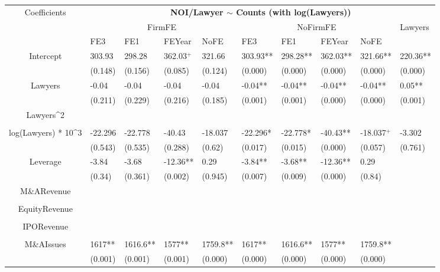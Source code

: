 \documentclass{article}
\begin{document}
\begin{table}[H]
\centering
\begin{tabular}{|clllllllll|}
\hline
\multirow{3}{*}{Coefficients} & \multicolumn{9}{c|}{\textbf{NOI/Lawyer $\sim$ Counts (with log(Lawyers))}} \\
\cline{2-10}
& \multicolumn{4}{c}{FirmFE} & \multicolumn{4}{c}{NoFirmFE} & \multirow{2}{*}{Lawyers} \\
\cline{2-9}
& FE3 & FE1 & FEYear & NoFE & FE3 & FE1 & FEYear & NoFE &  \\
\hline
 
Intercept & 303.93 & 298.28 & 362.03$^{+}$ & 321.66 & 303.93** & 298.28** & 362.03** & 321.66** & 220.36** \\ 
   & (0.148) & (0.156) & (0.085) & (0.124) & (0.000) & (0.000) & (0.000) & (0.000) & (0.000) \\ 
  Lawyers & -0.04 & -0.04 & -0.04 & -0.04 & -0.04** & -0.04** & -0.04** & -0.04** & 0.05** \\ 
   & (0.211) & (0.229) & (0.216) & (0.185) & (0.001) & (0.001) & (0.000) & (0.000) & (0.001) \\ 
  Lawyers^2 &  &  &  &  &  &  &  &  &  \\ 
   &  &  &  &  &  &  &  &  &  \\ 
  log(Lawyers) * 10^3 & -22.296 & -22.778 & -40.43 & -18.037 & -22.296* & -22.778* & -40.43** & -18.037$^{+}$ & -3.302 \\ 
   & (0.543) & (0.535) & (0.288) & (0.62) & (0.017) & (0.015) & (0.000) & (0.057) & (0.761) \\ 
  Leverage & -3.84 & -3.68 & -12.36** & 0.29 & -3.84** & -3.68** & -12.36** & 0.29 &  \\ 
   & (0.34) & (0.361) & (0.002) & (0.945) & (0.007) & (0.009) & (0.000) & (0.84) &  \\ 
  M\&ARevenue &  &  &  &  &  &  &  &  &  \\ 
   &  &  &  &  &  &  &  &  &  \\ 
  EquityRevenue &  &  &  &  &  &  &  &  &  \\ 
   &  &  &  &  &  &  &  &  &  \\ 
  IPORevenue &  &  &  &  &  &  &  &  &  \\ 
   &  &  &  &  &  &  &  &  &  \\ 
  M\&AIssues & 1617** & 1616.6** & 1577** & 1759.8** & 1617** & 1616.6** & 1577** & 1759.8** &  \\ 
   & (0.001) & (0.001) & (0.001) & (0.000) & (0.000) & (0.000) & (0.000) & (0.000) &  \\ 

\end{tabular}
\end{table}
\end{document}

